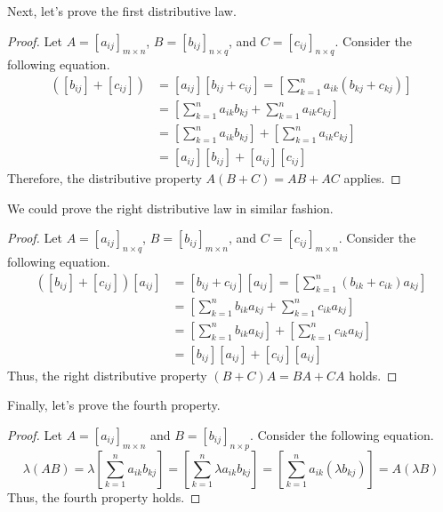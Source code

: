 \documentclass[../../main.tex]{subfiles}
\begin{document}
Next, let's prove the first distributive law.

\begin{proof}
Let $A = [a_{ij}]_{m \times n}$, $B = [b_{ij}]_{n \times q}$,
and $C = [c_{ij}]_{n \times q}$. Consider the following equation.
\begin{align*}
    [a_{ij}] \left( [b_{ij}] + [c_{ij}] \right)
    &= [a_{ij}] [b_{ij} + c_{ij}]
    = \left[ \sum_{k=1}^{n} a_{ik} (b_{kj} + c_{kj}) \right] \\
    &= \left[
        \sum_{k=1}^{n} a_{ik} b_{kj} + \sum_{k=1}^{n} a_{ik} c_{kj}
    \right] \\
    &= \left[ \sum_{k=1}^{n} a_{ik} b_{kj} \right]
        + \left[ \sum_{k=1}^{n} a_{ik} c_{kj} \right] \\
    &= [a_{ij}] [b_{ij}] + [a_{ij}] [c_{ij}]
\end{align*}
Therefore, the distributive property $A(B + C) = AB + AC$ applies.
\end{proof}

We could prove the right distributive law in similar fashion.

\begin{proof}
Let $A = [a_{ij}]_{n \times q}$, $B = [b_{ij}]_{m \times n}$,
and $C = [c_{ij}]_{m \times n}$. Consider the following equation.
\begin{align*}
    \left( [b_{ij}] + [c_{ij}] \right) [a_{ij}]
    &= [b_{ij} + c_{ij}] [a_{ij}]
    = \left[ \sum_{k=1}^{n} (b_{ik} + c_{ik}) a_{kj} \right] \\
    &= \left[
        \sum_{k=1}^{n} b_{ik} a_{kj} + \sum_{k=1}^{n} c_{ik} a_{kj}
    \right] \\
    &= \left[ \sum_{k=1}^{n} b_{ik} a_{kj} \right]
        + \left[ \sum_{k=1}^{n} c_{ik} a_{kj} \right] \\
    &= [b_{ij}] [a_{ij}] + [c_{ij}] [a_{ij}]
\end{align*}
Thus, the right distributive property $(B + C)A = BA + CA$ holds.
\end{proof}

Finally, let's prove the fourth property.

\begin{proof}
Let $A = [a_{ij}]_{m \times n}$ and $B = [b_{ij}]_{n \times p}$.
Consider the following equation.
\[
\lambda (AB)
= \lambda \left[ \sum_{k = 1}^{n} a_{ik} b_{kj} \right]
= \left[ \sum_{k = 1}^{n} \lambda a_{ik} b_{kj} \right]
= \left[ \sum_{k = 1}^{n} a_{ik} (\lambda b_{kj}) \right]
= A(\lambda B)
\]
Thus, the fourth property holds.
\end{proof}
\end{document}
